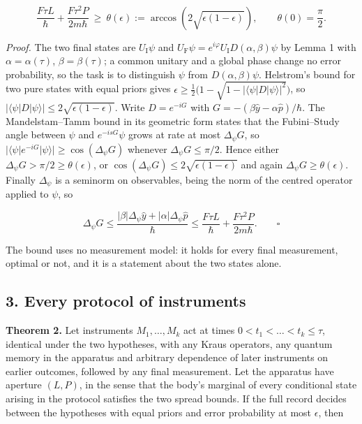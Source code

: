 \documentclass[11pt,a4paper]{article}
\begin{document}
\[\frac{F\tau L}{\hbar}+\frac{F\tau^2P}{2m\hbar}\ \ge\
\theta(\epsilon):=\arccos\!\left(2\sqrt{\epsilon(1-\epsilon)}\right),
\qquad\theta(0)=\frac\pi2 .\]

\emph{Proof.} The two final states are \(U_{\mathrm I}\psi\) and
\(U_{\mathrm F}\psi=e^{i\varphi}U_{\mathrm I}D(\alpha,\beta)\psi\) by
Lemma 1 with \(\alpha=\alpha(\tau)\), \(\beta=\beta(\tau)\); a common
unitary and a global phase change no error probability, so the task is
to distinguish \(\psi\) from \(D(\alpha,\beta)\psi\). Helstrom's bound
for two pure states with equal priors gives
\(\epsilon\ge\frac12\bigl(1-\sqrt{1-|\langle\psi|D|\psi\rangle|^2}\bigr)\),
so \(|\langle\psi|D|\psi\rangle|\le2\sqrt{\epsilon(1-\epsilon)}\). Write
\(D=e^{-iG}\) with \(G=-(\beta\hat y-\alpha\hat p)/\hbar\). The
Mandelstam--Tamm bound in its geometric form states that the
Fubini--Study angle between \(\psi\) and \(e^{-isG}\psi\) grows at rate
at most \(\Delta_\psi G\), so
\(|\langle\psi|e^{-iG}|\psi\rangle|\ge\cos(\Delta_\psi G)\) whenever
\(\Delta_\psi G\le\pi/2\). Hence either
\(\Delta_\psi G>\pi/2\ge\theta(\epsilon)\), or
\(\cos(\Delta_\psi G)\le2\sqrt{\epsilon(1-\epsilon)}\) and again
\(\Delta_\psi G\ge\theta(\epsilon)\). Finally \(\Delta_\psi\) is a
seminorm on observables, being the norm of the centred operator applied
to \(\psi\), so

\[\Delta_\psi G\le\frac{|\beta|\Delta_\psi\hat y+|\alpha|\Delta_\psi\hat p}{\hbar}
\le\frac{F\tau L}{\hbar}+\frac{F\tau^2P}{2m\hbar}. \qquad\square\]

The bound uses no measurement model: it holds for every final
measurement, optimal or not, and it is a statement about the two states
alone.

\hypertarget{every-protocol-of-instruments}{%
\subsection{3. Every protocol of
instruments}\label{every-protocol-of-instruments}}

\textbf{Theorem 2.} Let instruments \(M_1,\dots,M_k\) act at times
\(0<t_1<\dots<t_k\le\tau\), identical under the two hypotheses, with any
Kraus operators, any quantum memory in the apparatus and arbitrary
dependence of later instruments on earlier outcomes, followed by any
final measurement. Let the apparatus have aperture \((L,P)\), in the
sense that the body's marginal of every conditional state arising in the
protocol satisfies the two spread bounds. If the full record decides
between the hypotheses with equal priors and error probability at most
\(\epsilon\), then
\end{document}
